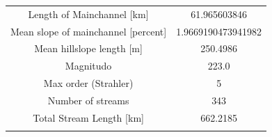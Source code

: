 \documentclass[11pt,]{article}
\begin{document}
\begin{longtable}[]{@{}cc@{}}
\begin{minipage}[t]{0.65\columnwidth}\centering\strut
Length of Mainchannel {[}km{]}\strut
\end{minipage} & \begin{minipage}[t]{0.29\columnwidth}\centering\strut
61.965603846\strut
\end{minipage}\tabularnewline
\begin{minipage}[t]{0.65\columnwidth}\centering\strut
Mean slope of mainchannel {[}percent{]}\strut
\end{minipage} & \begin{minipage}[t]{0.29\columnwidth}\centering\strut
1.9669190473941982\strut
\end{minipage}\tabularnewline
\begin{minipage}[t]{0.65\columnwidth}\centering\strut
Mean hillslope length {[}m{]}\strut
\end{minipage} & \begin{minipage}[t]{0.29\columnwidth}\centering\strut
250.4986\strut
\end{minipage}\tabularnewline
\begin{minipage}[t]{0.65\columnwidth}\centering\strut
Magnitudo\strut
\end{minipage} & \begin{minipage}[t]{0.29\columnwidth}\centering\strut
223.0\strut
\end{minipage}\tabularnewline
\begin{minipage}[t]{0.65\columnwidth}\centering\strut
Max order (Strahler)\strut
\end{minipage} & \begin{minipage}[t]{0.29\columnwidth}\centering\strut
5\strut
\end{minipage}\tabularnewline
\begin{minipage}[t]{0.65\columnwidth}\centering\strut
Number of streams\strut
\end{minipage} & \begin{minipage}[t]{0.29\columnwidth}\centering\strut
343\strut
\end{minipage}\tabularnewline
\begin{minipage}[t]{0.65\columnwidth}\centering\strut
Total Stream Length {[}km{]}\strut
\end{minipage} & \begin{minipage}[t]{0.29\columnwidth}\centering\strut
662.2185\strut
\end{minipage}\tabularnewline
\begin{minipage}[t]{0.65\columnwidth}\centering\strut

\end{minipage}
\end{longtable}
\end{document}
